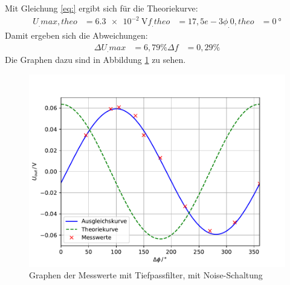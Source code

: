 Mit Gleichung \eqref{eq:} ergibt sich für die Theoriekurve:
\begin{align*}
U_.{max,theo} &= \SI{6,3e-2}{\volt}
f_.{theo}	  &= 17,5e-3
\phi_.{0,theo}&= \SI{0}{\degree}
\end{align*}
Damit ergeben sich die Abweichungen:
\begin{align*}
\Delta U_.{max} &= 6,79\%
\Delta f		&= 0,29\%
\end{align*}
Die Graphen dazu sind in Abbildung \ref{fig:U4} zu sehen.
\begin{figure}
\centering
\includegraphics[scale=0.5]{content/images/plot2.pdf}
\caption{Graphen der Messwerte mit Tiefpassfilter, mit Noise-Schaltung}\label{fig:U4}
\end{figure}
